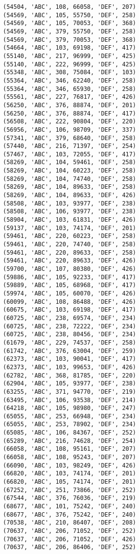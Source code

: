 \begin{verbatim}
(54504, 'ABC', 108, 66058, 'DEF', 207)
(54569, 'ABC', 105, 55750, 'DEF', 258)
(54569, 'ABC', 105, 70053, 'DEF', 368)
(54569, 'ABC', 379, 55750, 'DEF', 258)
(54569, 'ABC', 379, 70053, 'DEF', 368)
(54664, 'ABC', 103, 69198, 'DEF', 417)
(55140, 'ABC', 217, 96999, 'DEF', 425)
(55140, 'ABC', 222, 96999, 'DEF', 425)
(55348, 'ABC', 308, 75084, 'DEF', 103)
(55364, 'ABC', 346, 62240, 'DEF', 258)
(55364, 'ABC', 346, 65930, 'DEF', 258)
(55561, 'ABC', 227, 76817, 'DEF', 426)
(56250, 'ABC', 376, 88874, 'DEF', 201)
(56250, 'ABC', 376, 88874, 'DEF', 417)
(56508, 'ABC', 222, 90804, 'DEF', 220)
(56956, 'ABC', 106, 98709, 'DEF', 337)
(57341, 'ABC', 379, 68640, 'DEF', 258)
(57440, 'ABC', 216, 71397, 'DEF', 254)
(57467, 'ABC', 103, 72055, 'DEF', 417)
(58269, 'ABC', 104, 59461, 'DEF', 258)
(58269, 'ABC', 104, 60223, 'DEF', 258)
(58269, 'ABC', 104, 74740, 'DEF', 258)
(58269, 'ABC', 104, 89633, 'DEF', 258)
(58269, 'ABC', 104, 89633, 'DEF', 426)
(58508, 'ABC', 103, 93977, 'DEF', 238)
(58508, 'ABC', 106, 93977, 'DEF', 238)
(58904, 'ABC', 103, 61831, 'DEF', 426)
(59137, 'ABC', 103, 74174, 'DEF', 201)
(59461, 'ABC', 220, 60223, 'DEF', 258)
(59461, 'ABC', 220, 74740, 'DEF', 258)
(59461, 'ABC', 220, 89633, 'DEF', 258)
(59461, 'ABC', 220, 89633, 'DEF', 426)
(59700, 'ABC', 107, 80380, 'DEF', 426)
(59886, 'ABC', 105, 92233, 'DEF', 417)
(59889, 'ABC', 105, 68968, 'DEF', 417)
(59974, 'ABC', 105, 60070, 'DEF', 426)
(60099, 'ABC', 108, 86488, 'DEF', 426)
(60675, 'ABC', 103, 69198, 'DEF', 417)
(60725, 'ABC', 238, 69574, 'DEF', 234)
(60725, 'ABC', 238, 72222, 'DEF', 234)
(60725, 'ABC', 238, 80456, 'DEF', 234)
(61679, 'ABC', 229, 74537, 'DEF', 258)
(61742, 'ABC', 376, 63004, 'DEF', 259)
(62373, 'ABC', 103, 90041, 'DEF', 417)
(62373, 'ABC', 103, 99653, 'DEF', 426)
(62782, 'ABC', 368, 81785, 'DEF', 220)
(62904, 'ABC', 105, 93977, 'DEF', 238)
(63255, 'ABC', 371, 94770, 'DEF', 219)
(63495, 'ABC', 106, 93538, 'DEF', 214)
(64218, 'ABC', 105, 98980, 'DEF', 247)
(65055, 'ABC', 253, 66948, 'DEF', 234)
(65055, 'ABC', 253, 78902, 'DEF', 234)
(65085, 'ABC', 106, 84367, 'DEF', 252)
(65289, 'ABC', 216, 74628, 'DEF', 254)
(66058, 'ABC', 108, 95161, 'DEF', 207)
(66058, 'ABC', 108, 95243, 'DEF', 207)
(66090, 'ABC', 103, 98249, 'DEF', 426)
(66820, 'ABC', 103, 74174, 'DEF', 201)
(66820, 'ABC', 105, 74174, 'DEF', 201)
(67252, 'ABC', 251, 73866, 'DEF', 252)
(67544, 'ABC', 376, 76036, 'DEF', 219)
(68677, 'ABC', 101, 75242, 'DEF', 240)
(68677, 'ABC', 376, 75242, 'DEF', 240)
(70538, 'ABC', 210, 86407, 'DEF', 208)
(70637, 'ABC', 206, 71052, 'DEF', 252)
(70637, 'ABC', 206, 71052, 'DEF', 426)
(70637, 'ABC', 206, 86406, 'DEF', 252)

\end{verbatim}
